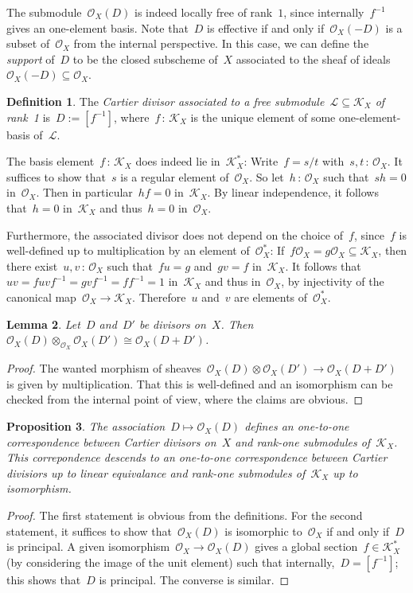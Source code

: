 \documentclass[10pt]{amsart}
\theoremstyle{definition}
\newtheorem{defn}{Definition}[section]
\theoremstyle{plain}
\newtheorem{prop}[defn]{Proposition}
\newtheorem{lemma}[defn]{Lemma}
\theoremstyle{remark}
\renewcommand{\O}{\mathcal{O}}
\newcommand{\K}{\mathcal{K}}
\renewcommand{\L}{\mathcal{L}}
\newcommand{\?}{\,{:}\,}
\renewcommand{\_}{\mathpunct{.}\,}
\begin{document}
The submodule~$\O_X(D)$ is indeed locally free of rank~$1$, since
internally~$f^{-1}$ gives an one-element basis. Note that~$D$ is effective if
and only if~$\O_X(-D)$ is a subset of~$\O_X$ from the internal perspective. In
this case, we can define the \emph{support} of~$D$ to be the closed subscheme
of~$X$ associated to the sheaf of ideals~$\O_X(-D) \subseteq \O_X$.

\begin{defn}The \emph{Cartier divisor associated to a free submodule~$\L \subseteq
\K_X$ of rank~1} is~$D := [f^{-1}]$, where~$f\?\K_X$ is the unique element of
some one-element-basis of~$\L$.\end{defn}

The basis element~$f\?\K_X$ does indeed lie in~$\K_X^*$: Write~$f
= s/t$ with~$s,t \? \O_X$. It suffices to show that~$s$ is a regular element
of~$\O_X$. So let~$h\?\O_X$ such that~$sh = 0$ in~$\O_X$. Then in
particular~$hf = 0$ in~$\K_X$. By linear independence, it follows that~$h = 0$
in~$\K_X$ and thus~$h = 0$ in~$\O_X$.

Furthermore, the associated divisor does not depend on the choice of~$f$,
since~$f$ is well-defined up to multiplication by an element of~$\O_X^*$: If~$f
\O_X = g \O_X \subseteq \K_X$, then there exist~$u,v\?\O_X$ such that~$fu = g$
and~$gv = f$ in~$\K_X$. It follows that~$uv = fuvf^{-1} = gvf^{-1} = ff^{-1} =
1$ in~$\K_X$ and thus in~$\O_X$, by injectivity of the canonical map~$\O_X \to
\K_X$. Therefore~$u$ and~$v$ are elements of~$\O_X^*$.

\begin{lemma}Let~$D$ and~$D'$ be divisors on~$X$. Then~$\O_X(D) \otimes_{\O_X}
\O_X(D') \cong \O_X(D + D')$.\end{lemma}
\begin{proof}The wanted morphism of sheaves~$\O_X(D) \otimes \O_X(D') \to
\O_X(D + D')$ is given by multiplication. That this is well-defined and an
isomorphism can be checked from the internal point of view, where the claims
are obvious.\end{proof}

\begin{prop}The association~$D \mapsto \O_X(D)$ defines an one-to-one
correspondence between Cartier divisors on~$X$ and rank-one submodules
of~$\K_X$. This correpondence descends to an one-to-one correspondence between
Cartier divisiors up to linear equivalance and rank-one submodules of~$\K_X$ up
to isomorphism.\end{prop}
\begin{proof}The first statement is obvious from the definitions. For the
second statement, it suffices to show that~$\O_X(D)$ is isomorphic to~$\O_X$ if
and only if~$D$ is principal. A given isomorphism~$\O_X \to \O_X(D)$ gives a
global section~$f \in \K_X^*$ (by considering the image of the unit element)
such that internally,~$D = [f^{-1}]$; this shows that~$D$ is principal. The
converse is similar.
\end{proof}
\end{document}
